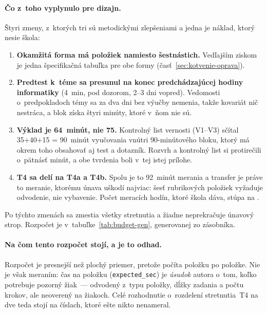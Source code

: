\paragraph{Čo z~toho vyplynulo pre dizajn.} Štyri zmeny, z~ktorých tri sú
metodickými zlepšeniami a jedna je náklad, ktorý nesie škola:

\begin{enumerate}[nosep]
    \item \textbf{Okamžitá forma má \asmFormItems{} položiek namiesto
          šestnástich.} Vedľajším ziskom je jedna špecifikačná tabuľka pre obe
          formy (časť~\ref{sec:kotvenie-oprava}).
    \item \textbf{Predtest k~téme sa presunul na konec predchádzajúcej hodiny
          informatiky} (4~min, pod dozorom, 2--3 dni vopred). Vedomosti
          o~predpokladoch témy sa za dva dni bez výučby nemenia, takže kovariát
          nič nestráca, a blok získa štyri minúty, ktoré v~ňom nie sú.
    \item \textbf{Výklad je 64~minút, nie 75.} Kontrolný list vernosti (V1--V3)
          sčítal 35+40+15 = 90~minút vyučovania vnútri 90-minútového bloku,
          ktorý má okrem toho obsahovať aj test a dotazník. Rozvrh a kontrolný
          list si protirečili o~pätnásť minút, a obe tvrdenia boli v~tej istej
          prílohe.
    \item \textbf{T4 sa delí na T4a a T4b.} Spolu je to 92~minút merania a
          transfer je práve to meranie, ktorému únava uškodí najviac: šesť
          rubrikových položiek vyžaduje odvodenie, nie vybavenie. Počet meracích
          hodín, ktoré škola dáva, stúpa na \asmMeasureLessons{}.
\end{enumerate}

Po týchto zmenách sa zmestia všetky stretnutia a žiadne neprekračuje únavový
strop. Rozpočet je v~tabuľke~\ref{tab:budget-gen}, generovanej zo zásobníka.

\paragraph{Na čom tento rozpočet stojí, a je to odhad.} Rozpočet je presnejší než
plochý priemer, pretože počíta položku po položke. Nie je však meraním: čas na
položku (\texttt{expected\_sec}) je \emph{úsudok} autora o~tom, koľko potrebuje
pozorný žiak~--- odvodený z~typu položky, dĺžky zadania a počtu krokov, ale
neoverený na žiakoch. Celé rozhodnutie o~rozdelení stretnutia~T4 na dve teda
stojí na číslach, ktoré ešte nikto nenameral.

